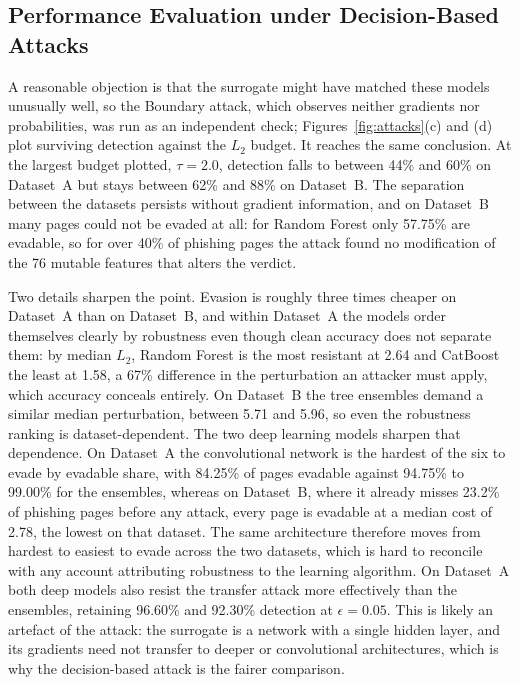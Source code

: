 \documentclass[runningheads]{llncs}
\begin{document}
\subsection{Performance Evaluation under Decision-Based Attacks}
\label{sec:res-boundary}

A reasonable objection is that the surrogate might have matched these models
unusually well, so the Boundary attack, which observes neither gradients nor
probabilities, was run as an independent check; Figures~\ref{fig:attacks}(c) and
(d) plot surviving detection against the $L_2$ budget. It reaches the same
conclusion. At the largest budget plotted, $\tau = 2.0$, detection falls to
between 44\% and 60\% on Dataset~A but stays between 62\% and 88\% on
Dataset~B. The separation between the datasets
persists without gradient information, and on Dataset~B many pages could not
be evaded at all: for Random Forest only 57.75\% are evadable, so for over 40\%
of phishing pages the attack found no modification of the 76 mutable features
that alters the verdict.


Two details sharpen the point. Evasion is roughly three times cheaper on
Dataset~A than on Dataset~B, and within Dataset~A the models order themselves
clearly by robustness even though clean accuracy does not separate them: by
median $L_2$, Random Forest is the most resistant at 2.64 and CatBoost the least
at 1.58, a 67\%
difference in the perturbation an attacker must apply, which accuracy conceals
entirely. On
Dataset~B the tree ensembles demand a similar median perturbation, between 5.71
and 5.96, so even the robustness ranking is dataset-dependent. The two
deep learning models sharpen that dependence. On Dataset~A the convolutional network is
the hardest of the six to evade by evadable share, with 84.25\% of pages evadable against 94.75\% to 99.00\% for the
ensembles, whereas on Dataset~B, where it already misses 23.2\% of phishing pages before
any attack, every page is evadable at a median cost of 2.78,
the lowest on that dataset. The same architecture therefore moves from hardest
to easiest to evade across the two datasets, which is hard to reconcile with any account
attributing robustness to the learning algorithm. On Dataset~A both deep models also resist
the transfer attack more effectively than the ensembles, retaining 96.60\% and
92.30\% detection at $\epsilon = 0.05$. This is likely an artefact of the attack:
the surrogate is a network with a single hidden layer, and its gradients need
not transfer to deeper or convolutional architectures, which is why the
decision-based attack is the fairer comparison.
\end{document}
